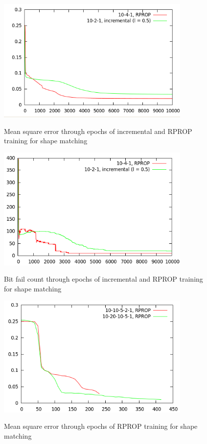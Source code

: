 \documentclass[times, utf8, zavrsni]{fer}
\begin{document}
\begin{figure}[htb]
\caption{Mean square error through epochs of incremental and RPROP training
for shape matching}
\centering
\includegraphics[width=0.85\textwidth]{images/shape-train01-mse}
\label{fig:shape-train-01-mse}
\end{figure}

\begin{figure}[htb]
\caption{Bit fail count through epochs of incremental and RPROP training
for shape matching}
\centering
\includegraphics[width=0.85\textwidth]{images/shape-train01-bf}
\label{fig:shape-train-01-bf}
\end{figure}


\begin{figure}[htb]
\caption{Mean square error through epochs of RPROP training for shape matching}
\centering
\includegraphics[width=0.85\textwidth]{images/shape-train02-mse}
\label{fig:shape-train-02-mse}
\end{figure}
\end{document}
